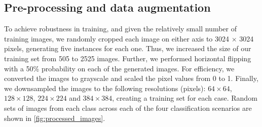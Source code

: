 \documentclass[Journal,letterpaper, SingleSpace, InsideFigs]{ascelike-new}
\begin{document}
\subsection{Pre-processing and data augmentation}
To achieve robustness in training, and given the relatively small number of training images, we randomly cropped each image on either axis to 3024 $\times$ 3024 pixels, generating five instances for each one. Thus, we increased the size of our training set from 505 to 2525 images. Further, we performed horizontal flipping with a 50\% probability on each of the generated images. For efficiency, we converted the images to grayscale and scaled the pixel values from 0 to 1. Finally, we downsampled the images to the following resolutions (pixels): $64 \times 64$, $128 \times 128$, $224 \times 224$ and $384\times 384$, creating a training set for each case. 
Random sets of images from each class across each of the four classification scenarios are shown in \autoref{fig:processed_images}.
\end{document}

